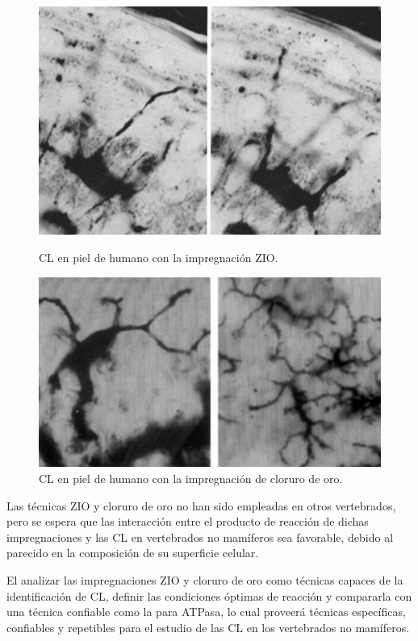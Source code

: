 \begin{figure}[h]
    \begin{minipage}[b]{0.225\textwidth}
        \centering
        \includegraphics[scale=0.2325,frame]{ImpregancionZIO.jpg}
        \caption{\small{CL en piel de humano con la impregnación ZIO.}}
    \end{minipage}
    \hfill
    \begin{minipage}[b]{0.25\textwidth}
        \centering
        \includegraphics[scale=0.2725,frame]{ImpregancionAu.jpg}
        \caption{\small{CL en piel de humano con la impregnación de cloruro de oro.}}
    \end{minipage}
\end{figure}

Las técnicas ZIO y cloruro de oro no han sido empleadas en otros vertebrados, pero se espera que las interacción entre el producto de reacción de dichas impregnaciones y las CL en vertebrados no mamíferos sea favorable, debido al parecido en la composición de su superficie celular.

El analizar las impregnaciones ZIO y cloruro de oro como técnicas capaces de la identificación de CL, definir las condiciones óptimas de reacción y  compararla con una técnica confiable como la  para ATPasa\cite{article:ATPasa}, lo cual proveerá técnicas específicas, confiables y repetibles para el estudio de las CL en los vertebrados no mamíferos.